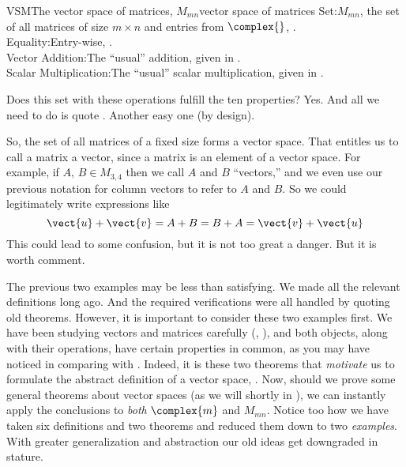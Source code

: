 %
\begin{example}{VSM}{The vector space of matrices, $M_{mn}$}{vector space of matrices}
Set:\quad $M_{mn}$, the set of all matrices of size $m\times n$ and entries from $\complex{\null}$, .\\
Equality:\quad Entry-wise, .\\
Vector Addition:\quad  The ``usual'' addition, given in .\\
Scalar Multiplication:\quad The ``usual'' scalar multiplication, given in .\par\medskip
%
Does this set with these operations fulfill the ten properties?  Yes.  And all we need to do is quote .  Another easy one (by design).
\end{example}
%
So, the set of all matrices of a fixed size forms a vector space.  That entitles us to call a matrix a vector, since a matrix is an element of a vector space.  For example, if $A,\,B\in M_{3,4}$ then we call $A$ and $B$ ``vectors,'' and we even use our previous notation for column vectors to refer to $A$ and $B$.  So we could legitimately write expressions like
%
\begin{equation*}
\vect{u}+\vect{v}=A+B=B+A=\vect{v}+\vect{u}
\end{equation*}
%
This could lead to some confusion, but it is not too great a danger.  But it is worth comment.\par
%
The previous two examples may be less than satisfying.  We made all the relevant definitions long ago.  And the required verifications were all handled by quoting old theorems.  However, it is important to consider these two examples first.  We have been studying vectors and matrices carefully (, ), and both objects, along with their operations, have certain properties in common, as you may have noticed in comparing  with .  Indeed, it is these two theorems that {\em motivate} us to formulate the abstract definition of a vector space, .  Now, should we prove some general theorems about vector spaces (as we will shortly in ), we can instantly apply the conclusions to {\em both} $\complex{m}$ and $M_{mn}$.  Notice too how we have taken six definitions and two theorems and reduced them down to two {\em examples\/}.  With greater generalization and abstraction our old ideas get downgraded in stature.\par
